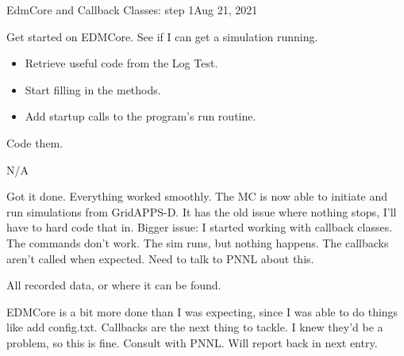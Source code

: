 \begin{entry}{EdmCore and Callback Classes: step 1}{Aug 21, 2021}
    \objective 
    
    Get started on EDMCore. See if I can get a simulation running.

    \outline

    \begin{itemize}
        \item Retrieve useful code from the Log Test.
        \item Start filling in the methods.
        \item Add startup calls to the program's run routine.

    \end{itemize}

    \procedures
    
    Code them.

    \parameters
    
    N/A

    \observations
    
    Got it done. Everything worked smoothly. The MC is now able to initiate and run simulations from GridAPPS-D.
    It has the old issue where nothing stops, I'll have to hard code that in.
    Bigger issue: I started working with callback classes. The commands don't work. The sim runs, but nothing happens.
    The callbacks aren't called when expected. Need to talk to PNNL about this.

    \data
    
    All recorded data, or where it can be found.
    
    \results
    
    EDMCore is a bit more done than I was expecting, since I was able to do things like add config.txt.
    Callbacks are the next thing to tackle. I knew they'd be a problem, so this is fine. Consult with PNNL. Will report
    back in next entry.

\end{entry}


